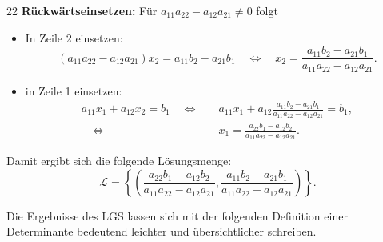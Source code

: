 \clearpage
\begin{tcolorbox}[
  scriptbox,
  breakable=false,
  borderline west={1.2pt}{0pt}{black!40},
  title={Beispiel~\ref{ex:linear_systems_determinant_from_gaussian_elimination}: Allgemeines $2\times2$-LGS -- Fortsetzung}
]
  \begin{ClozeArea}[34]{22}
    \textbf{Rückwärtseinsetzen:} Für
    $a_{11}a_{22}-a_{12}a_{21}\neq0$ folgt
    \begin{itemize}[leftmargin=2.1em,itemsep=0.7em]
      \item In Zeile 2 einsetzen:
        \[
          (a_{11}a_{22}-a_{12}a_{21})x_2
          =a_{11}b_2-a_{21}b_1
          \quad\Longleftrightarrow\quad
          x_2=\frac{a_{11}b_2-a_{21}b_1}
          {a_{11}a_{22}-a_{12}a_{21}}.
        \]
      \item in Zeile 1 einsetzen:
        \[
          \begin{aligned}
            a_{11}x_1+a_{12}x_2=b_1
            \quad\Longleftrightarrow\quad&
            a_{11} x_1 + a_{12} \frac{a_{11}b_2-a_{21}b_1}{a_{11}a_{22}-a_{12}a_{21}} = b_1 ,\\[0.6em]
            \quad\Longleftrightarrow\quad&
            x_1=\frac{a_{22}b_1-a_{12}b_2}{a_{11}a_{22}-a_{12}a_{21}}.
          \end{aligned}
        \]
    \end{itemize}
    Damit ergibt sich die folgende Lösungsmenge:
    \[
      \mathcal L=
      \left\{
        \left(
          \frac{a_{22}b_1-a_{12}b_2}{a_{11}a_{22}-a_{12}a_{21}},
          \frac{a_{11}b_2-a_{21}b_1}{a_{11}a_{22}-a_{12}a_{21}}
        \right)
      \right\}.
    \]
  \end{ClozeArea}
\end{tcolorbox}

Die Ergebnisse des LGS lassen sich mit der folgenden Definition einer Determinante
bedeutend leichter und übersichtlicher schreiben.

